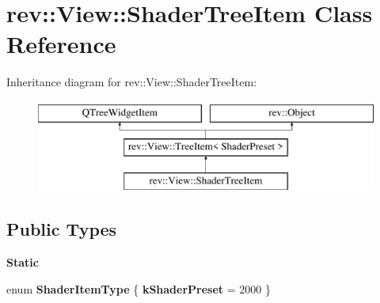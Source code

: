 \hypertarget{classrev_1_1_view_1_1_shader_tree_item}{}\section{rev\+::View\+::Shader\+Tree\+Item Class Reference}
\label{classrev_1_1_view_1_1_shader_tree_item}
Inheritance diagram for rev\+::View\+::Shader\+Tree\+Item\+:\begin{figure}[H]
\begin{center}
\leavevmode
\includegraphics[height=3.000000cm]{classrev_1_1_view_1_1_shader_tree_item}
\end{center}
\end{figure}
\subsection*{Public Types}
\begin{Indent}\textbf{ Static}\par
\begin{DoxyCompactItemize}
\item 
\mbox{\label{classrev_1_1_view_1_1_shader_tree_item_a3a530b20fd73dfbdaec04fbd3d5cefa2}} 
enum {\bfseries Shader\+Item\+Type} \{ {\bfseries k\+Shader\+Preset} = 2000
 \}
\end{DoxyCompactItemize}
\end{Indent}
